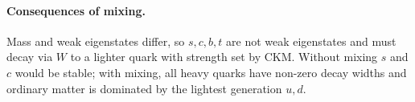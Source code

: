 \documentclass[11pt]{article}
\begin{document}
\paragraph{Consequences of mixing.} Mass and weak eigenstates differ, so $s,c,b,t$ are not weak eigenstates and must decay via $W$ to a lighter quark with strength set by CKM. Without mixing $s$ and $c$ would be stable; with mixing, all heavy quarks have non-zero decay widths and ordinary matter is dominated by the lightest generation $u,d$.
\end{document}
